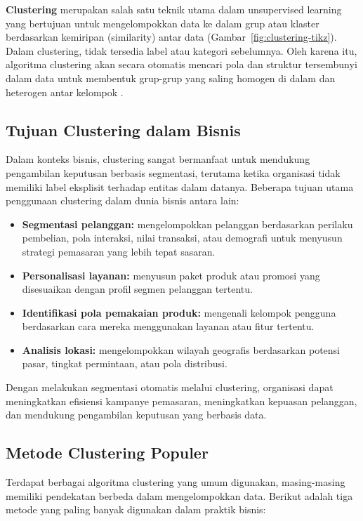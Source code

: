 \textbf{Clustering} merupakan salah satu teknik utama dalam unsupervised learning yang bertujuan untuk mengelompokkan data ke dalam grup atau klaster berdasarkan kemiripan (similarity) antar data (Gambar~\ref{fig:clustering-tikz}). Dalam clustering, tidak tersedia label atau kategori sebelumnya. Oleh karena itu, algoritma clustering akan secara otomatis mencari pola dan struktur tersembunyi dalam data untuk membentuk grup-grup yang saling homogen di dalam dan heterogen antar kelompok \cite{kelleher2015fundamentals}.

\subsection*{Tujuan Clustering dalam Bisnis}

Dalam konteks bisnis, clustering sangat bermanfaat untuk mendukung pengambilan keputusan berbasis segmentasi, terutama ketika organisasi tidak memiliki label eksplisit terhadap entitas dalam datanya. Beberapa tujuan utama penggunaan clustering dalam dunia bisnis antara lain:

\begin{itemize}
	\item \textbf{Segmentasi pelanggan:} mengelompokkan pelanggan berdasarkan perilaku pembelian, pola interaksi, nilai transaksi, atau demografi untuk menyusun strategi pemasaran yang lebih tepat sasaran.
	\item \textbf{Personalisasi layanan:} menyusun paket produk atau promosi yang disesuaikan dengan profil segmen pelanggan tertentu.
	\item \textbf{Identifikasi pola pemakaian produk:} mengenali kelompok pengguna berdasarkan cara mereka menggunakan layanan atau fitur tertentu.
	\item \textbf{Analisis lokasi:} mengelompokkan wilayah geografis berdasarkan potensi pasar, tingkat permintaan, atau pola distribusi.
\end{itemize}

Dengan melakukan segmentasi otomatis melalui clustering, organisasi dapat meningkatkan efisiensi kampanye pemasaran, meningkatkan kepuasan pelanggan, dan mendukung pengambilan keputusan yang berbasis data.

\subsection*{Metode Clustering Populer}

Terdapat berbagai algoritma clustering yang umum digunakan, masing-masing memiliki pendekatan berbeda dalam mengelompokkan data. Berikut adalah tiga metode yang paling banyak digunakan dalam praktik bisnis:

